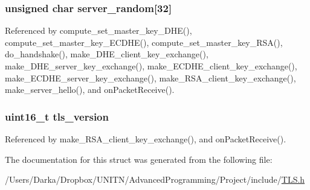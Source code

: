 \subsubsection[{\texorpdfstring{server\+\_\+random}{server_random}}]{\setlength{\rightskip}{0pt plus 5cm}unsigned char server\+\_\+random\mbox{[}32\mbox{]}}\hypertarget{struct_t_l_s__parameters__t_a9159f146fbc286a8b55f4aa83396ae2f}{}\label{struct_t_l_s__parameters__t_a9159f146fbc286a8b55f4aa83396ae2f}


Referenced by compute\+\_\+set\+\_\+master\+\_\+key\+\_\+\+D\+H\+E(), compute\+\_\+set\+\_\+master\+\_\+key\+\_\+\+E\+C\+D\+H\+E(), compute\+\_\+set\+\_\+master\+\_\+key\+\_\+\+R\+S\+A(), do\+\_\+handshake(), make\+\_\+\+D\+H\+E\+\_\+client\+\_\+key\+\_\+exchange(), make\+\_\+\+D\+H\+E\+\_\+server\+\_\+key\+\_\+exchange(), make\+\_\+\+E\+C\+D\+H\+E\+\_\+client\+\_\+key\+\_\+exchange(), make\+\_\+\+E\+C\+D\+H\+E\+\_\+server\+\_\+key\+\_\+exchange(), make\+\_\+\+R\+S\+A\+\_\+client\+\_\+key\+\_\+exchange(), make\+\_\+server\+\_\+hello(), and on\+Packet\+Receive().

\subsubsection[{\texorpdfstring{tls\+\_\+version}{tls_version}}]{\setlength{\rightskip}{0pt plus 5cm}uint16\+\_\+t tls\+\_\+version}\hypertarget{struct_t_l_s__parameters__t_a8fd63193690a09b75e0aaf9b971ed3df}{}\label{struct_t_l_s__parameters__t_a8fd63193690a09b75e0aaf9b971ed3df}


Referenced by make\+\_\+\+R\+S\+A\+\_\+client\+\_\+key\+\_\+exchange(), and on\+Packet\+Receive().



The documentation for this struct was generated from the following file\+:\begin{DoxyCompactItemize}
\item 
/\+Users/\+Darka/\+Dropbox/\+U\+N\+I\+T\+N/\+Advanced\+Programming/\+Project/include/\hyperlink{_t_l_s_8h}{T\+L\+S.\+h}\end{DoxyCompactItemize}
